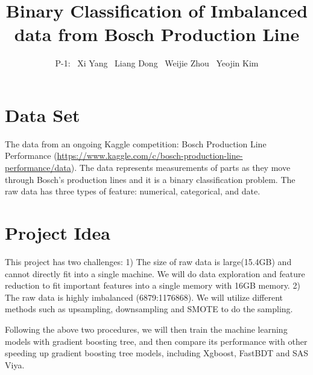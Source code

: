 \documentclass{article}
\title{Binary Classification of Imbalanced data from Bosch Production Line}
\author{
    P-1: \ Xi Yang \ Liang Dong \ Weijie Zhou \ Yeojin Kim
}
\begin{document}

\maketitle

\section{Data Set}

The data from an ongoing Kaggle competition: Bosch Production Line Performance (\url{https://www.kaggle.com/c/bosch-production-line-performance/data}). The data represents measurements of parts as they move through Bosch's production lines and it is a binary classification problem. The raw data has three types of feature: numerical, categorical, and date.

\section{Project Idea}

This project has two challenges: 1) The size of raw data is large(15.4GB) and cannot directly fit into a single machine. We will do data exploration and feature reduction to fit important features into a single memory with 16GB memory. 2) The raw data is highly imbalanced (6879:1176868). We will utilize different methods such as upsampling, downsampling and SMOTE to do the sampling.

Following the above two procedures, we will then train the machine learning models with gradient boosting tree, and then compare its performance with other speeding up gradient boosting tree models, including Xgboost, FastBDT and SAS Viya.


\end{document}
